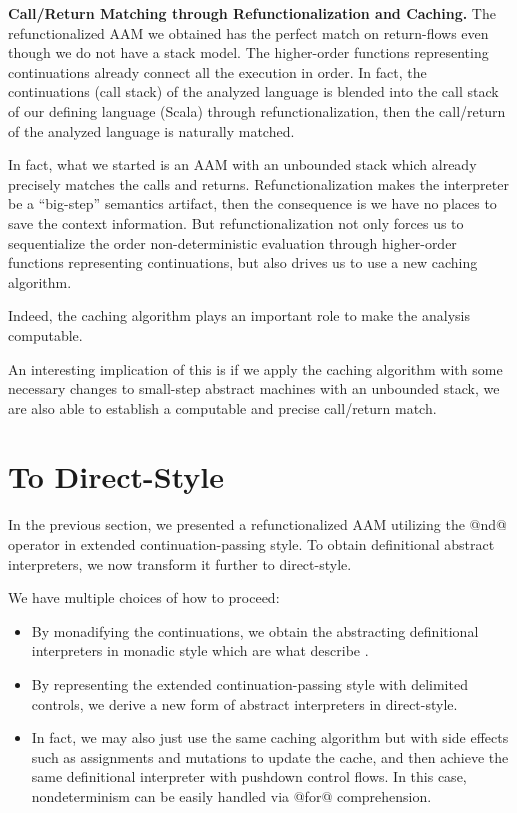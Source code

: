 \documentclass[acmsmall]{acmart}\settopmatter{}
\begin{document}
\textbf{Call/Return Matching through Refunctionalization and Caching.}
The refunctionalized AAM we obtained has the perfect match on return-flows even though we do not have a stack model. The higher-order functions representing continuations already connect all the execution in order. In fact, the continuations (call stack) of the analyzed language is blended into the call stack of our defining language (Scala) through refunctionalization, then the call/return of the analyzed language is naturally matched.

In fact, what we started is an AAM with an unbounded stack which already precisely matches the calls and returns.
Refunctionalization makes the interpreter be a ``big-step'' semantics artifact, then the consequence is we have no places to save the context information. 
But refunctionalization not only forces us to sequentialize the order non-deterministic evaluation through higher-order functions representing continuations, 
but also drives us to use a new caching algorithm.  

Indeed, the caching algorithm plays an important role to make the analysis computable. 

An interesting implication of this is if we apply the caching algorithm with some necessary changes to small-step abstract machines with an unbounded stack, we are also able to establish a computable and precise call/return match.


\section{To Direct-Style} \label{directstyle}

In the previous section, we presented a refunctionalized AAM utilizing the @nd@ operator
in extended continuation-passing style.
To obtain definitional abstract interpreters, we now transform it further to direct-style.

We have multiple choices of how to proceed:
\begin{itemize}
  \item By monadifying the continuations, we obtain the abstracting
    definitional interpreters in monadic style which are what \citeauthor{darais2017abstracting}
    describe \cite{darais2017abstracting}.
  \item By representing the extended continuation-passing style with delimited controls,
    we derive a new form of abstract interpreters in direct-style.
  \item In fact, we may also just use the same caching algorithm but with side effects such as
    assignments and mutations to update the cache, and then achieve the same
    definitional interpreter with pushdown control flows. In this case, nondeterminism can be
    easily handled via @for@ comprehension.
\end{itemize}
\end{document}
